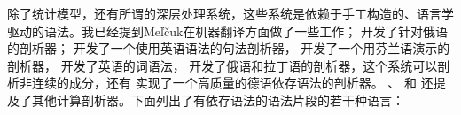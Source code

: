 除了统计模型，还有所谓的深层处理系统，这些系统是依赖于手工构造的、语言学驱动的语法。我已经提到Meľčuk在机器翻译方面做了一些工作； \citet{HZ60a-u}开发了针对俄语的剖析器； \citet{SN86a}开发了一个使用英语语法的句法剖析器， \citet*{JLV86a-u}开发了一个用芬兰语演示的剖析器， \citet{Hellwig86a-u,Hellwig2003a,Hellwig2006a}开发了英语的词语法， \citet{Covington90a}开发了俄语和拉丁语的剖析器，这个系统可以剖析非连续的成分，还有 \citet{Menzel98a-u}实现了一个高质量的德语依存语法的剖析器。 \citet{Kettunen86a-u}、 \citet{Lehtola86a-u}和 \citet{MS98a-u}还提及了其他计算剖析器。下面列出了有依存语法的语法片段的若干种语言：

